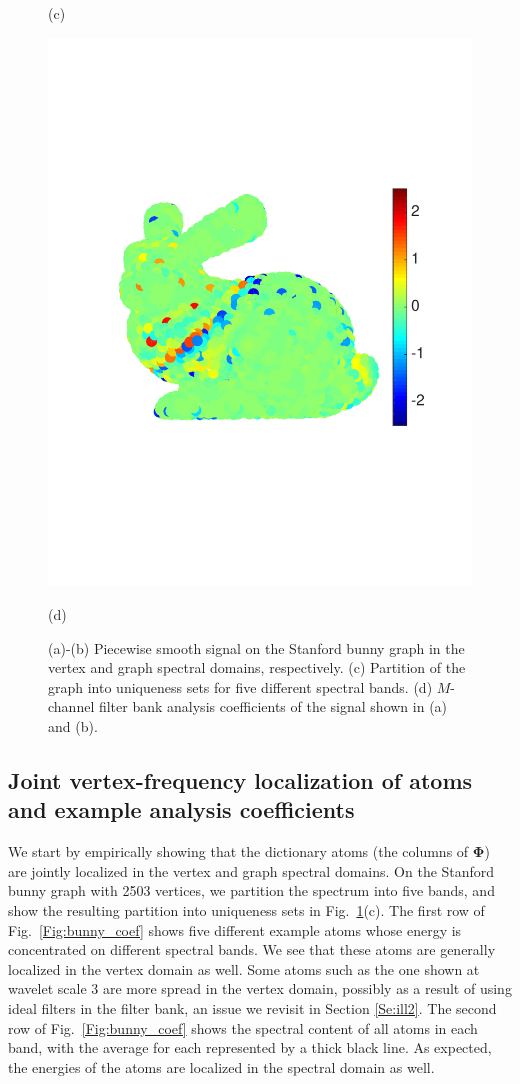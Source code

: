 \documentclass[journal, 10pt]{IEEEtran}
\begin{document}
\begin{figure}[tbh]
\begin{minipage}[m]{0.48\linewidth}
\centerline{\small{(c)}}
\end{minipage}
\begin{minipage}[m]{0.48\linewidth}
\centerline{\includegraphics[width=.8\linewidth]{fig_bunny_coef_all}}
\centerline{\small{(d)}}
\end{minipage}
\caption{(a)-(b) Piecewise smooth signal on the Stanford bunny graph \cite{bunny} in the vertex and graph spectral domains, respectively. (c) Partition of the graph into uniqueness sets for five different spectral bands. (d) $M$-channel filter bank analysis coefficients of the signal shown in (a) and (b).}\label{Fig:bunny_signal}
\end{figure}

\subsection{Joint vertex-frequency localization of atoms and example analysis coefficients}
We start by empirically showing that the dictionary atoms (the columns of $\boldsymbol{\Phi}$) are jointly localized in the vertex and graph spectral domains. On the Stanford bunny graph \cite{bunny} with 2503 vertices, we partition the spectrum into five bands, and show the resulting partition into uniqueness sets 
in Fig.\ \ref{Fig:bunny_signal}(c). The first row of Fig.\ \ref{Fig:bunny_coef} shows five different example atoms whose energy is concentrated on different spectral bands. We see that these atoms are generally localized in the vertex domain as well. Some atoms such as the one shown at wavelet scale 3 are more spread in the vertex domain, possibly as a result of using ideal filters in the filter bank, an issue we revisit in Section \ref{Se:ill2}. The second row of Fig.\ \ref{Fig:bunny_coef} shows the spectral content of all atoms in each band, with the average for each represented by a thick black line. As expected, the energies of the atoms are localized in the spectral domain as well. 
\end{document}
